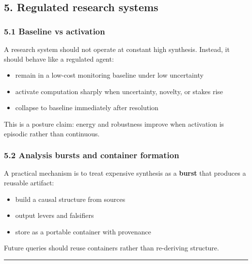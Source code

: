 \documentclass[11pt]{article}
\providecommand{\tightlist}{%
  \setlength{\itemsep}{0pt}\setlength{\parskip}{0pt}}
\begin{document}
\hypertarget{regulated-research-systems}{%
\subsection{5. Regulated research
systems}\label{regulated-research-systems}}

\hypertarget{baseline-vs-activation}{%
\subsubsection{5.1 Baseline vs
activation}\label{baseline-vs-activation}}

A research system should not operate at constant high synthesis.
Instead, it should behave like a regulated agent:

\begin{itemize}
\tightlist
\item
  remain in a low-cost monitoring baseline under low uncertainty
\item
  activate computation sharply when uncertainty, novelty, or stakes rise
\item
  collapse to baseline immediately after resolution
\end{itemize}

This is a posture claim: energy and robustness improve when activation
is episodic rather than continuous.

\hypertarget{analysis-bursts-and-container-formation}{%
\subsubsection{5.2 Analysis bursts and container
formation}\label{analysis-bursts-and-container-formation}}

A practical mechanism is to treat expensive synthesis as a
\textbf{burst} that produces a reusable artifact:

\begin{itemize}
\tightlist
\item
  build a causal structure from sources
\item
  output levers and falsifiers
\item
  store as a portable container with provenance
\end{itemize}

Future queries should reuse containers rather than re-deriving
structure.

\begin{center}\rule{0.5\linewidth}{0.5pt}\end{center}
\end{document}
